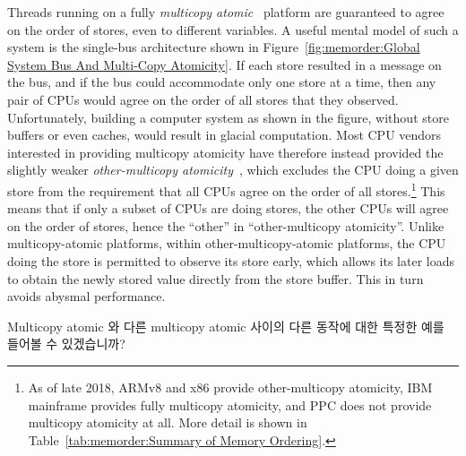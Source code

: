 Threads running on a fully
\emph{multicopy atomic}~\cite{Stone:1995:SP:623262.623912}
platform are guaranteed
to agree on the order of stores, even to different variables.
A useful mental model of such a system is the single-bus architecture
shown in
Figure~\ref{fig:memorder:Global System Bus And Multi-Copy Atomicity}.
If each store resulted in a message on the bus, and if the bus could
accommodate only one store at a time, then any pair of CPUs would
agree on the order of all stores that they observed.
Unfortunately, building a computer system as shown in the figure,
without store buffers or even caches, would result in glacial computation.
Most CPU vendors interested in providing multicopy atomicity have therefore
instead provided the slightly weaker
\emph{other-multicopy atomicity}~\cite[Section B2.3]{ARMv8A:2017},
which excludes the CPU doing a given store from the requirement that all
CPUs agree on the order of all stores.\footnote{
	As of late 2018, ARMv8 and x86 provide other-multicopy atomicity,
	IBM mainframe provides fully multicopy atomicity, and PPC does
	not provide multicopy atomicity at all. More detail is shown in
	Table~\ref{tab:memorder:Summary of Memory Ordering}.}
This means that if only a subset of CPUs are doing stores, the
other CPUs will agree on the order of stores, hence the ``other''
in ``other-multicopy atomicity''.
Unlike multicopy-atomic platforms, within other-multicopy-atomic platforms,
the CPU doing the store is permitted to observe its
store early, which allows its later loads to obtain the newly stored
value directly from the store buffer.
This in turn avoids abysmal performance.
\fi

\QuickQuiz{}
	Multicopy atomic 와 다른 multicopy atomic 사이의 다른 동작에 대한
	특정한 예를 들어볼 수 있겠습니까?
	\iffalse

